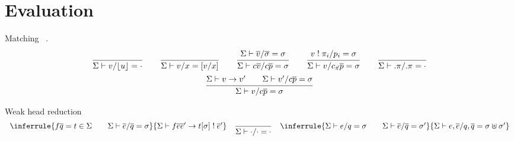 \documentclass[acmlarge,fleqn]{acmart}\settopmatter{}
\begin{document}
\section{Evaluation}
\label{sec:evaluation}


Matching \ .
\begin{gather*}
\ru{}{\Sigma \vdash v/\lfloor u \rfloor = \cdot} %
\qquad
\ru{}{\Sigma \vdash v/x = [v/x]} %
\qquad
\ru
  {\Sigma \vdash \overline{v}/\overline{\sigma} = \sigma}
  {\Sigma \vdash c\overline{v}/c\overline{p} = \sigma}  %
\qquad
\ru{v \bang \pi_i / p_i = \sigma}
{\Sigma \vdash v / \cpi \overline{p} = \sigma} %
\qquad
\ru{}{\Sigma \vdash .\pi/.\pi = \cdot} %
\\
\ru{\Sigma \vdash v \to v' \qquad \Sigma \vdash v'/c\overline{p} = \sigma}
{\Sigma \vdash v / c \overline{p} = \sigma} %
\end{gather*}


Weak head reduction 
\[
\begin{array}{lll}
\inferrule{f \overline q = t \in \Sigma \qquad \Sigma \vdash \overline{e}/\overline{q} = \sigma}
{\Sigma \vdash f \overline{e} \overline{e}' \to t[\sigma] \bang \overline{e}'}
&
\ru{}
{\Sigma \vdash \cdot/\cdot = \cdot} %
&
\inferrule{\Sigma \vdash e/q = \sigma \qquad \Sigma \vdash \overline{e}/\overline{q} = \sigma'}
{\Sigma \vdash e, \overline{e}/q, \overline{q} = \sigma \uplus \sigma'}%
\end{array}
\]
\end{document}
